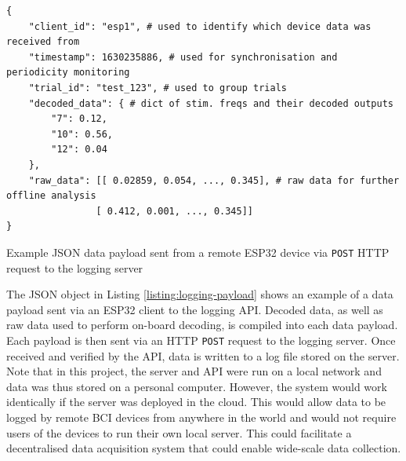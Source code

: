 \begin{listing}[h]
\small
\begin{verbatim}
{
    "client_id": "esp1", # used to identify which device data was received from
    "timestamp": 1630235886, # used for synchronisation and periodicity monitoring
    "trial_id": "test_123", # used to group trials 
    "decoded_data": { # dict of stim. freqs and their decoded outputs
        "7": 0.12,
        "10": 0.56, 
        "12": 0.04
    },
    "raw_data": [[ 0.02859, 0.054, ..., 0.345], # raw data for further offline analysis
                [ 0.412, 0.001, ..., 0.345]]
}
\end{verbatim}
\caption{Example JSON data payload sent from a remote ESP32 device via \texttt{POST} HTTP request to the logging server}
\label{listing:logging-payload}

\end{listing}
The JSON object in Listing \ref{listing:logging-payload} shows an example of a data payload sent via an ESP32 client to the logging API. Decoded data, as well as raw data used to perform on-board decoding, is compiled into each data payload. Each payload is then sent via an HTTP \texttt{POST} request to the logging server. Once received and verified by the API, data is written to a log file stored on the server. Note that in this project, the server and API were run on a local network and data was thus stored on a personal computer. However, the system would work identically if the server was deployed in the cloud. This would allow data to be logged by remote BCI devices from anywhere in the world and would not require users of the devices to run their own local server. This could facilitate a decentralised data acquisition system that could enable wide-scale data collection.  


